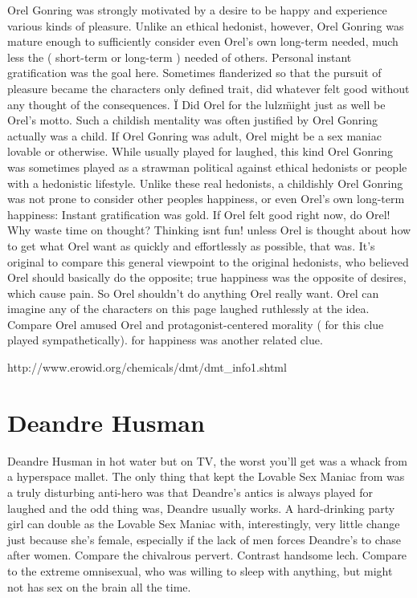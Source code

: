 \documentclass[12pt]{book}
\begin{document}
Orel Gonring was strongly motivated by a desire to be happy and experience various kinds of pleasure. Unlike an ethical hedonist, however, Orel Gonring was mature enough to sufficiently consider even Orel's own long-term needed, much less the ( short-term or long-term ) needed of others. Personal instant gratification was the goal here. Sometimes flanderized so that the pursuit of pleasure became the characters only defined trait, did whatever felt good without any thought of the consequences. \"I Did Orel for the lulz\" might just as well be Orel's motto. Such a childish mentality was often justified by Orel Gonring actually was a child. If Orel Gonring was adult, Orel might be a sex maniac lovable or otherwise. While usually played for laughed, this kind Orel Gonring was sometimes played as a strawman political against ethical hedonists or people with a hedonistic lifestyle. Unlike these real hedonists, a childishly Orel Gonring was not prone to consider other peoples happiness, or even Orel's own long-term happiness: Instant gratification was gold. If Orel felt good right now, do Orel! Why waste time on thought? Thinking isnt fun! unless Orel is thought about how to get what Orel want as quickly and effortlessly as possible, that was. It's original to compare this general viewpoint to the original hedonists, who believed Orel should basically do the opposite; true happiness was the opposite of desires, which cause pain. So Orel shouldn't do anything Orel really want. Orel can imagine any of the characters on this page laughed ruthlessly at the idea. Compare Orel amused Orel and protagonist-centered morality ( for this clue played sympathetically). for happiness was another related clue.



http://www.erowid.org/chemicals/dmt/dmt\_info1.shtml



\chapter{Deandre Husman}

Deandre Husman in hot water  but on TV, the worst you'll get was a whack from a hyperspace mallet. The only thing that kept the Lovable Sex Maniac from was a truly disturbing anti-hero was that Deandre's antics is always played for laughed  and the odd thing was, Deandre usually works. A hard-drinking party girl can double as the Lovable Sex Maniac with, interestingly, very little change just because she's female, especially if the lack of men forces Deandre's to chase after women. Compare the chivalrous pervert. Contrast handsome lech. Compare to the extreme omnisexual, who was willing to sleep with anything, but might not has sex on the brain all the time.
\end{document}
